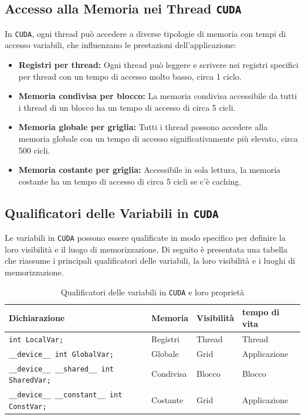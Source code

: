 \subsection{Accesso alla Memoria nei Thread \texttt{CUDA}}
In \texttt{CUDA}, ogni thread può accedere a diverse tipologie di memoria con tempi di accesso variabili, che influenzano le prestazioni dell'applicazione:
\begin{itemize}
    \item \textbf{Registri per thread:} Ogni thread può leggere e scrivere nei registri specifici per thread con un tempo di accesso molto basso, circa 1 ciclo.
    \item \textbf{Memoria condivisa per blocco:} La memoria condivisa accessibile da tutti i thread di un blocco ha un tempo di accesso di circa 5 cicli.
    \item \textbf{Memoria globale per griglia:} Tutti i thread possono accedere alla memoria globale con un tempo di accesso significativamente più elevato, circa 500 cicli.
    \item \textbf{Memoria costante per griglia:} Accessibile in sola lettura, la memoria costante ha un tempo di accesso di circa 5 cicli se c'è caching.
\end{itemize}

\subsection{Qualificatori delle Variabili in \texttt{CUDA}}
Le variabili in \texttt{CUDA} possono essere qualificate in modo specifico per
definire la loro visibilità e il luogo di memorizzazione. Di seguito è presentata
una tabella che riassume i principali qualificatori delle variabili, la loro
visibilità e i luoghi di memorizzazione.

\begin{table}[H]
\centering
\begin{tabular}{|l|l|l|l|}
\hline
\textbf{Dichiarazione} & \textbf{Memoria} & \textbf{Visibilità} & \textbf{tempo di vita} \\
\hline
\texttt{int LocalVar;} & Registri & Thread & Thread \\
\texttt{\_\_device\_\_ int GlobalVar;} & Globale & Grid & Applicazione \\
\texttt{\_\_device\_\_ \_\_shared\_\_ int SharedVar;} & Condivisa & Blocco & Blocco \\
\texttt{\_\_device\_\_ \_\_constant\_\_ int ConstVar;} & Costante & Grid & Applicazione \\
\hline
\end{tabular}
\caption{Qualificatori delle variabili in \texttt{CUDA} e loro proprietà}
\label{tab:cuda_variable_qualifiers}
\end{table}
